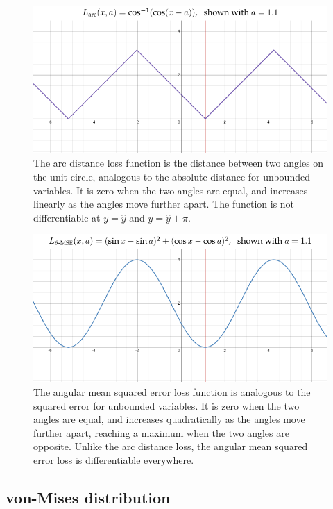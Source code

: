 \begin{figure}
    \centering
    \includegraphics[width=0.9\linewidth]{figures/loss-arc.pdf}
    \captionsetup{parskip=7pt}
    \caption[Arc distance loss]{The arc distance loss function is the distance between two angles on the unit circle, analogous to the absolute distance for unbounded variables. It is zero when the two angles are equal, and increases linearly as the angles move further apart. The function is not differentiable at $y = \hat{y}$ and $y = \hat{y} + \pi$.}
    \hrulefill
    \label{fig:loss-arc}
\end{figure}
\begin{figure}
    \centering
    \includegraphics[width=0.9\linewidth]{figures/loss-amse.pdf}
    \captionsetup{parskip=7pt}
    \caption[Angular mean squared error loss]{The angular mean squared error loss function is analogous to the squared error for unbounded variables. It is zero when the two angles are equal, and increases quadratically as the angles move further apart, reaching a maximum when the two angles are opposite. Unlike the arc distance loss, the angular mean squared error loss is differentiable everywhere.}
    \label{fig:loss-amse}
\end{figure}

\clearpage


\subsection{von-Mises distribution}
\label{ss:von-mises}


